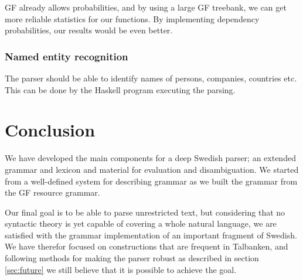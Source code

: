 \documentclass{report}
\begin{document}
GF already allows probabilities, and by using a large
GF treebank, we can get more reliable statistics for our functions. 
By implementing dependency probabilities, our results would be even better.

\subsubsection{Named entity recognition}
The parser should be able to identify names of persons, companies, countries etc.
This can be done by the Haskell program executing the parsing.






\section{Conclusion}


We have developed the main components
for a deep Swedish parser; an extended grammar and lexicon and material for
evaluation and disambiguation. %
We started from a well-defined system for describing grammar as we built
the grammar from the GF resource grammar.


Our final goal is to be able to parse unrestricted text, but considering that
no syntactic theory is yet capable
of covering a whole natural language, we are satisfied with %
the grammar implementation of an important fragment of Swedish.
We have therefor focused on constructions that are frequent in Talbanken, 
and following methods for making the parser robust as described in section \ref{sec:future}
we still believe that it is possible to achieve the goal. 
\\
\end{document}
